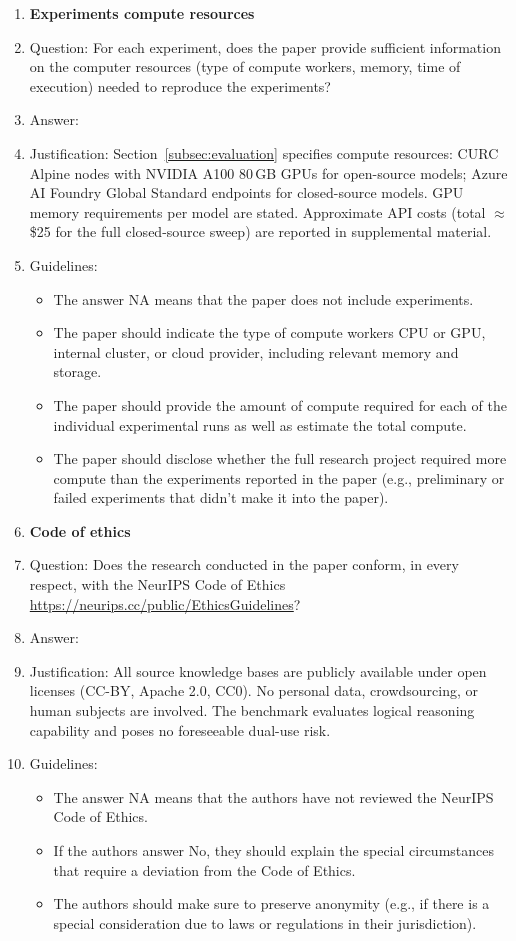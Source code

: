 \documentclass{article}
\theoremstyle{definition}
\begin{document}
\begin{enumerate}
\item {\bf Experiments compute resources}
    \item[] Question: For each experiment, does the paper provide sufficient information on the computer resources (type of compute workers, memory, time of execution) needed to reproduce the experiments?
    \item[] Answer: \answerYes{}
    \item[] Justification: Section~\ref{subsec:evaluation} specifies compute resources: CURC Alpine nodes with NVIDIA A100 80\,GB GPUs for open-source models; Azure AI Foundry Global Standard endpoints for closed-source models. GPU memory requirements per model are stated. Approximate API costs (total $\approx$\$25 for the full closed-source sweep) are reported in supplemental material.
    \item[] Guidelines:
    \begin{itemize}
        \item The answer NA means that the paper does not include experiments.
        \item The paper should indicate the type of compute workers CPU or GPU, internal cluster, or cloud provider, including relevant memory and storage.
        \item The paper should provide the amount of compute required for each of the individual experimental runs as well as estimate the total compute. 
        \item The paper should disclose whether the full research project required more compute than the experiments reported in the paper (e.g., preliminary or failed experiments that didn't make it into the paper). 
    \end{itemize}
    
\item {\bf Code of ethics}
    \item[] Question: Does the research conducted in the paper conform, in every respect, with the NeurIPS Code of Ethics \url{https://neurips.cc/public/EthicsGuidelines}?
    \item[] Answer: \answerYes{}
    \item[] Justification: All source knowledge bases are publicly available under open licenses (CC-BY, Apache 2.0, CC0). No personal data, crowdsourcing, or human subjects are involved. The benchmark evaluates logical reasoning capability and poses no foreseeable dual-use risk.
    \item[] Guidelines:
    \begin{itemize}
        \item The answer NA means that the authors have not reviewed the NeurIPS Code of Ethics.
        \item If the authors answer No, they should explain the special circumstances that require a deviation from the Code of Ethics.
        \item The authors should make sure to preserve anonymity (e.g., if there is a special consideration due to laws or regulations in their jurisdiction).
    \end{itemize}



\end{enumerate}
\end{document}
